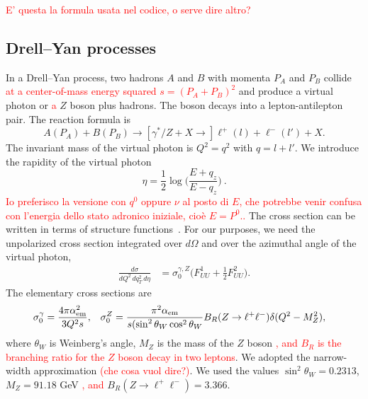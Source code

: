 \documentclass[aps,preprintnumbers,showpacs,nofootinbib,superscriptaddress,floatfix]{revtex4}
\begin{document}
\textcolor{red}{ E' questa la formula usata nel codice, o serve dire altro?}


\subsection{Drell--Yan processes}
\label{ss:DY_formalism}

In a Drell--Yan process, two hadrons $A$ and $B$ with momenta $P_A$ and $P_B$ collide \textcolor{red}{at a center-of-mass energy squared $s = (P_A + P_B)^2$} and produce a virtual photon or \textcolor{red}{a} $Z$ boson plus hadrons. 
The boson decays into a
lepton-antilepton pair. The reaction formula is
\begin{equation}
A(P_A)+B(P_B)\to [\gamma^*/Z + X \to] \ell^+(l) + \ell^-(l') + X.
\end{equation} 
The invariant mass of the virtual photon is $Q^2=q^2$ with $q = l + l'$. 
We introduce the rapidity of the virtual photon
\begin{equation}
\eta=\frac{1}{2}\log\bigg(\frac{E+q_z}{E-q_z}\bigg)\  .
\end{equation} 
\textcolor{red}{Io preferisco la versione con $q^0$ oppure $\nu$ al posto di $E$, che potrebbe venir confusa con l'energia dello stato adronico iniziale, cio\`e $E=P^0$..} 
The cross section can be written in terms of structure
functions~\cite{Boer:2006eq,Arnold:2008kf}. For our purposes, we need the unpolarized 
cross section
integrated over $d\Omega$ and over the azimuthal angle of the virtual photon, 
\begin{align}
\frac{d\sigma}{dQ^2\, dq_T^2\,d\eta} &= \sigma_0^{\gamma,Z}
\bigg(F_{UU}^1 + \frac{1}{2} F_{UU}^2\bigg). 
\end{align} 
The elementary cross sections are
\begin{align}
\sigma_0^{\gamma} &= \frac{4\pi \alpha^2_{\rm em}}{3 Q^2 s},
&
\sigma_0^Z &= 
\frac{\pi^2 \alpha_{\rm em}}{s (\sin^2{\theta_W} \cos^2{\theta_W}}
B_R(Z\rightarrow \ell^+\ell^-)
\delta(Q^2 - M_Z^2), 
\end{align} 
where $\theta_W$ is Weinberg's angle, $M_Z$ is the mass of the $Z$ boson \textcolor{red}{, and $B_R$ is the branching ratio for the $Z$ boson decay in two leptons}.
We adopted the narrow-width approximation \textcolor{red}{(che cosa vuol dire?)}. We used the values 
$\sin^2 \theta_W= 0.2313$, $M_Z = 91.18$ GeV \textcolor{red}{, and} 
$B_R(Z\rightarrow \ell^+\ell^-)=3.366$.  
\end{document}
